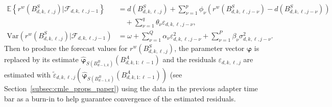 \documentclass[10pt,a4paper,oneside]{article}
\newcommand{\E}{\mathbb{E}}
\newcommand{\SigAl}{\mathcal{F}}
\begin{document}
\begin{align*}
    \E \left \{ r^w(B^{S}_{d,k,\ell,j}) \big| \SigAl_{d, k, \ell, j - 1} \right \}                   & =d\left( B^S_{d,k,\ell,j} \right) + \sum^p_{\nu = 1} \phi_{\nu} \left( r^w(B^{S}_{d,k,\ell,j- \nu}) - d\left( B^S_{d,k,\ell,j - \nu} \right) \right) \\
                                                                                                     & \quad+ \sum^q_{\nu = 1} \theta_{\nu} \varepsilon_{d, k, \ell, j - \nu},                                                                              \\
    \mathrm{Var}\left(r^w\left( B^S_{d, k, \ell, j}\right) \bigg| \SigAl_{d, k, \ell, j - 1} \right) & = \omega + \sum^{Q}_{\nu = 1} \alpha_{\nu} \varepsilon^2_{d,k,\ell,j - \nu} + \sum^P_{\nu = 1} \beta_{\nu} \sigma_{d, k, \ell, j - \nu}^2.
\end{align*}
Then to produce the forecast values for $r^w(B^{S}_{d,k,\ell,j})$, the parameter vector $\boldsymbol{\varphi}$ is replaced by its estimate $\hat{\boldsymbol{\varphi}}_{S\left(B^B_{d - 1, k}\right)}\left( B^A_{d,k,1:\ell - 1} \right)$ and the residuals $\varepsilon_{d,k,\ell,j}$ are estimated with $\tilde{\varepsilon}_{d,k,\ell,j} \left( \hat{\boldsymbol{\varphi}}_{S\left(B^B_{d - 1, k}\right)}\left( B^A_{d,k,1:\ell - 1} \right) \right)$ (see Section~\ref{subsec:cmle_props_paper}) using the data in the previous adapter time bar as a burn-in to help guarantee convergence of the estimated residuals.


\end{document}
